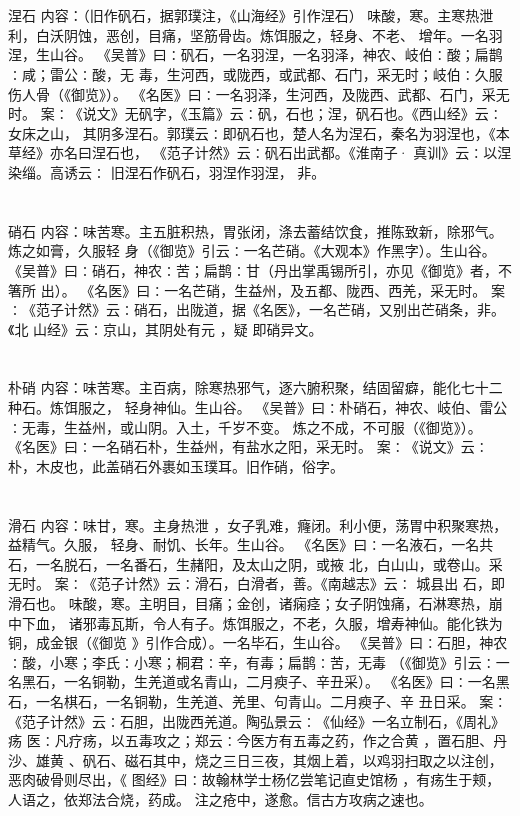 \documentclass[12pt,UTF8]{ctexbook}
\begin{document}
\chapter{}涅石
内容：（旧作矾石，据郭璞注，《山海经》引作涅石） 
味酸，寒。主寒热泄利，白沃阴蚀，恶创，目痛，坚筋骨齿。炼饵服之，轻身、不老、 
增年。一名羽涅，生山谷。 
《吴普》曰∶矾石，一名羽涅，一名羽泽，神农、岐伯∶酸；扁鹊∶咸；雷公∶酸，无 
毒，生河西，或陇西，或武都、石门，采无时；岐伯∶久服伤人骨（《御览》）。 
《名医》曰∶一名羽泽，生河西，及陇西、武都、石门，采无时。 
案∶《说文》无矾字，《玉篇》云∶矾，石也；涅，矾石也。《西山经》云∶女床之山， 
其阴多涅石。郭璞云∶即矾石也，楚人名为涅石，秦名为羽涅也，《本草经》亦名曰涅石也， 
《范子计然》云∶矾石出武都。《淮南子· 真训》云∶以涅染缁。高诱云∶ 
旧涅石作矾石，羽涅作羽涅， 
非。 

\chapter{}硝石
内容：味苦寒。主五脏积热，胃张闭，涤去蓄结饮食，推陈致新，除邪气。炼之如膏，久服轻 
身（《御览》引云∶一名芒硝。《大观本》作黑字）。生山谷。 
《吴普》曰∶硝石，神农∶苦；扁鹊∶甘（丹出掌禹锡所引，亦见《御览》者，不箸所 
出）。 
《名医》曰∶一名芒硝，生益州，及五都、陇西、西羌，采无时。 
案∶《范子计然》云∶硝石，出陇道，据《名医》，一名芒硝，又别出芒硝条，非。《北 
山经》云∶京山，其阴处有元 ，疑 即硝异文。 


\chapter{}朴硝
内容：味苦寒。主百病，除寒热邪气，逐六腑积聚，结固留癖，能化七十二种石。炼饵服之， 
轻身神仙。生山谷。 
《吴普》曰∶朴硝石，神农、岐伯、雷公∶无毒，生益州，或山阴。入土，千岁不变。 
炼之不成，不可服（《御览》）。 
《名医》曰∶一名硝石朴，生益州，有盐水之阳，采无时。 
案∶《说文》云∶朴，木皮也，此盖硝石外裹如玉璞耳。旧作硝，俗字。 


\chapter{}滑石
内容：味甘，寒。主身热泄 ，女子乳难，癃闭。利小便，荡胃中积聚寒热，益精气。久服， 
轻身、耐饥、长年。生山谷。 
《名医》曰∶一名液石，一名共石，一名脱石，一名番石，生赭阳，及太山之阴，或掖 
北，白山山，或卷山。采无时。 
案∶《范子计然》云∶滑石，白滑者，善。《南越志》云∶ 城县出 石，即滑石也。 
味酸，寒。主明目，目痛；金创，诸痫痉；女子阴蚀痛，石淋寒热，崩中下血， 
诸邪毒瓦斯，令人有子。炼饵服之，不老，久服，增寿神仙。能化铁为铜，成金银（《御览 
》引作合成）。一名毕石，生山谷。 
《吴普》曰∶石胆，神农∶酸，小寒；李氏∶小寒；桐君∶辛，有毒；扁鹊∶苦，无毒 
（《御览》引云∶一名黑石，一名铜勒，生羌道或名青山，二月瘐子、辛丑采）。 
《名医》曰∶一名黑石，一名棋石，一名铜勒，生羌道、羌里、句青山。二月瘐子、辛 
丑日采。 
案∶《范子计然》云∶石胆，出陇西羌道。陶弘景云∶《仙经》一名立制石，《周礼》疡 
医∶凡疗疡，以五毒攻之；郑云∶今医方有五毒之药，作之合黄 ，置石胆、丹沙、雄黄 
、矾石、磁石其中，烧之三日三夜，其烟上着，以鸡羽扫取之以注创，恶肉破骨则尽出，《 
图经》曰∶故翰林学士杨亿尝笔记直史馆杨 ，有疡生于颊，人语之，依郑法合烧，药成。 
注之疮中，遂愈。信古方攻病之速也。 
\end{document}
